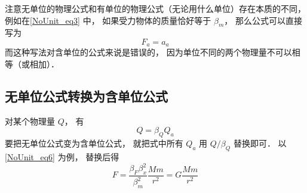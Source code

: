 注意无单位的物理公式和有单位的物理公式（无论用什么单位）存在本质的不同， 例如在\autoref{NoUnit_eq3} 中， 如果受力物体的质量恰好等于 $\beta_m$， 那么公式可以直接写为
\begin{equation}\label{NoUnit_eq7}
F_a = a_a
\end{equation}
而这种写法对含单位的公式来说是错误的， 因为单位不同的两个物理量不可以相等（或相加）．

\subsection{无单位公式转换为含单位公式}
对某个物理量 $Q$， 有
\begin{equation}
Q = \beta_Q Q_a
\end{equation}
要把无单位公式变为含单位公式， 就把式中所有 $Q_a$ 用 $Q/\beta_Q$ 替换即可． 以\autoref{NoUnit_eq6} 为例， 替换后得
\begin{equation}
F = \frac{\beta_F\beta_x^2}{\beta_m^2} \frac{Mm}{r^2} = G\frac{Mm}{r^2}
\end{equation}
